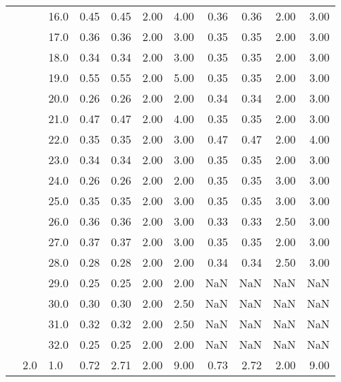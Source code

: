 \begin{tabular}{lllrrrrrrrr}
       &     & 16.0 &       0.45 &      0.45 & 2.00 &   4.00 &       0.36 &      0.36 & 2.00 &   3.00 \\
       &     & 17.0 &       0.36 &      0.36 & 2.00 &   3.00 &       0.35 &      0.35 & 2.00 &   3.00 \\
       &     & 18.0 &       0.34 &      0.34 & 2.00 &   3.00 &       0.35 &      0.35 & 2.00 &   3.00 \\
       &     & 19.0 &       0.55 &      0.55 & 2.00 &   5.00 &       0.35 &      0.35 & 2.00 &   3.00 \\
       &     & 20.0 &       0.26 &      0.26 & 2.00 &   2.00 &       0.34 &      0.34 & 2.00 &   3.00 \\
       &     & 21.0 &       0.47 &      0.47 & 2.00 &   4.00 &       0.35 &      0.35 & 2.00 &   3.00 \\
       &     & 22.0 &       0.35 &      0.35 & 2.00 &   3.00 &       0.47 &      0.47 & 2.00 &   4.00 \\
       &     & 23.0 &       0.34 &      0.34 & 2.00 &   3.00 &       0.35 &      0.35 & 2.00 &   3.00 \\
       &     & 24.0 &       0.26 &      0.26 & 2.00 &   2.00 &       0.35 &      0.35 & 3.00 &   3.00 \\
       &     & 25.0 &       0.35 &      0.35 & 2.00 &   3.00 &       0.35 &      0.35 & 3.00 &   3.00 \\
       &     & 26.0 &       0.36 &      0.36 & 2.00 &   3.00 &       0.33 &      0.33 & 2.50 &   3.00 \\
       &     & 27.0 &       0.37 &      0.37 & 2.00 &   3.00 &       0.35 &      0.35 & 2.00 &   3.00 \\
       &     & 28.0 &       0.28 &      0.28 & 2.00 &   2.00 &       0.34 &      0.34 & 2.50 &   3.00 \\
       &     & 29.0 &       0.25 &      0.25 & 2.00 &   2.00 &        NaN &       NaN &  NaN &    NaN \\
       &     & 30.0 &       0.30 &      0.30 & 2.00 &   2.50 &        NaN &       NaN &  NaN &    NaN \\
       &     & 31.0 &       0.32 &      0.32 & 2.00 &   2.50 &        NaN &       NaN &  NaN &    NaN \\
       &     & 32.0 &       0.25 &      0.25 & 2.00 &   2.00 &        NaN &       NaN &  NaN &    NaN \\
       & 2.0 & 1.0  &       0.72 &      2.71 & 2.00 &   9.00 &       0.73 &      2.72 & 2.00 &   9.00 \\

\end{tabular}
